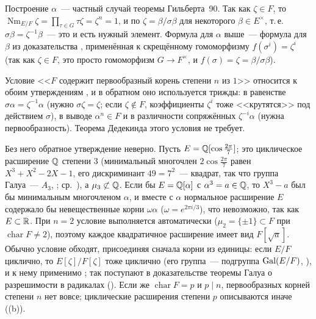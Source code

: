 \begin{center}
\end{center}

Построение $\alpha$~--- частный случай теоремы Гильберта~90. Так как $\zeta\in F$, то
$\operatorname{Nm}_{E/F}\zeta=\prod_{\tau\in G}\tau\zeta=\zeta^n=1$, и по  $\zeta=\beta/\sigma\beta$ для некоторого
$\beta\in E^\times$, т.\,е.\ $\sigma\beta=\zeta^{-1}\beta$~--- это и есть нужный элемент. Формула для $\alpha$ выше~---
формула для $\beta$ из доказательства , применённая к скрещённому гомоморфизму $f(\sigma^i)=\zeta^i$ (так как
$\zeta\in F$, это просто гомоморфизм $G\to F^\times$, и $f(\sigma)=\zeta=\beta/\sigma\beta$).

\begin{remark}
Условие <<$F$ содержит первообразный корень степени $n$ из $1$>> относится к обоим утверждениям , и в обратном
оно используется трижды: в равенстве $\sigma\alpha=\zeta^{-1}\alpha$ (нужно $\sigma\zeta=\zeta$; если $\zeta\notin F$,
коэффициенты $\zeta^i$ тоже <<крутятся>> под действием $\sigma$), в выводе $\alpha^n\in F$ и в различности сопряжённых
$\zeta^{-i}\alpha$ (нужна первообразность). Теорема Дедекинда этого условия не требует.

Без него обратное утверждение неверно. Пусть $E=\mathbb Q[\cos\frac{2\pi}7]$; это циклическое расширение $\mathbb Q$ степени $3$
(минимальный многочлен $2\cos\frac{2\pi}7$ равен $X^3+X^2-2X-1$, его дискриминант $49=7^2$~--- квадрат, так что группа
Галуа~--- $A_3$, ; ср.\ ), а $\mu_3\not\subset\mathbb Q$.
Если бы $E=\mathbb Q[\alpha]$ с $\alpha^3=a\in\mathbb Q$, то $X^3-a$ был бы минимальным многочленом $\alpha$, и вместе с $\alpha$
нормальное расширение $E$ содержало бы невещественные корни $\omega\alpha$ ($\omega=e^{2\pi i/3}$), что невозможно, так как
$E\subset\mathbb R$. При $n=2$ условие выполняется автоматически ($\mu_2=\{\pm1\}\subset F$ при $\operatorname{char}F\ne2$), поэтому
каждое квадратичное расширение имеет вид $F[\sqrt a]$. Обычно условие обходят, присоединяя сначала корни из единицы:
если $E/F$ циклично, то $E[\zeta]/F[\zeta]$ тоже циклично (его группа~--- подгруппа $\operatorname{Gal}(E/F)$, ), и к нему
применимо ; так поступают в доказательстве теоремы Галуа о разрешимости в радикалах (). Если же
$\operatorname{char}F=p$ и $p\mid n$, первообразных корней степени $n$ нет вовсе; циклические расширения степени $p$
описываются иначе ((b)).
\end{remark}

